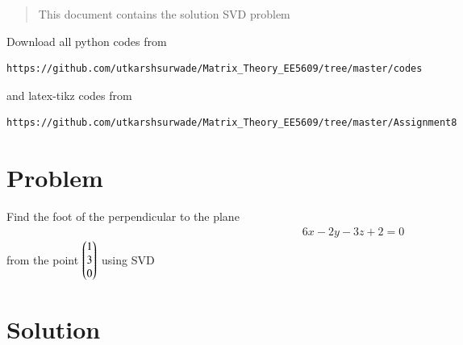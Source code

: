 \documentclass[journal,12pt,twocolumn]{IEEEtran}
\begin{document}
%
\begin{abstract}
This document contains the solution SVD problem
\end{abstract}
Download all python codes from 
%
\begin{lstlisting}
https://github.com/utkarshsurwade/Matrix_Theory_EE5609/tree/master/codes
\end{lstlisting}
%
and latex-tikz codes from 
%
\begin{lstlisting}
https://github.com/utkarshsurwade/Matrix_Theory_EE5609/tree/master/Assignment8
\end{lstlisting}
%

 \section{\textbf{Problem}}
 Find the foot of the perpendicular to the plane
\begin{align}
6x-2y-3z+2 = 0 \label{eq:equation}
\end{align}
from the point $\begin{pmatrix}1\\3\\0\end{pmatrix}$ using SVD

  \section{\textbf{Solution}}
  
  
  
\end{document}
